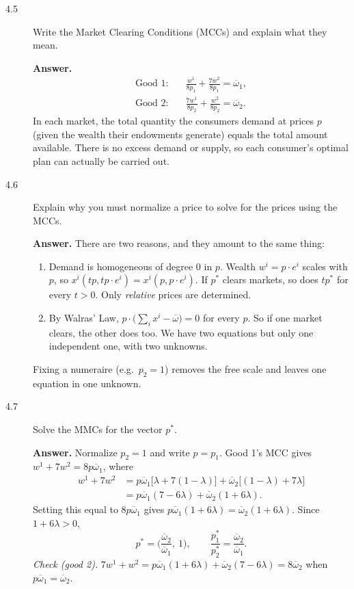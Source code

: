 \documentclass[11pt]{article}
\newcommand{\bw}{\overline{\omega}}
\newenvironment{solution}{\par\smallskip\noindent\textbf{Answer.} }{\par\medskip}
\begin{document}
\begin{description}
\item[4.5] Write the Market Clearing Conditions (MCCs) and explain what they mean.
\begin{solution}
\begin{align*}
\text{Good 1:}&\quad \frac{w^1}{8p_1}+\frac{7w^2}{8p_1}=\bw_1,\\
\text{Good 2:}&\quad \frac{7w^1}{8p_2}+\frac{w^2}{8p_2}=\bw_2.
\end{align*}
In each market, the total quantity the consumers demand at prices $p$ (given the wealth their endowments generate) equals the total amount available. There is no excess demand or supply, so each consumer's optimal plan can actually be carried out.
\end{solution}

\item[4.6] Explain why you must normalize a price to solve for the prices using the MCCs.
\begin{solution}
There are two reasons, and they amount to the same thing:
\begin{enumerate}[itemsep=0pt]
\item Demand is homogeneous of degree 0 in $p$. Wealth $w^i=p\cdot e^i$ scales with $p$, so $x^i(tp,tp\cdot e^i)=x^i(p,p\cdot e^i)$. If $p^*$ clears markets, so does $tp^*$ for every $t>0$. Only \emph{relative} prices are determined.
\item By Walras' Law, $p\cdot\big(\sum_i x^i-\bw\big)=0$ for every $p$. So if one market clears, the other does too. We have two equations but only one independent one, with two unknowns.
\end{enumerate}
Fixing a numeraire (e.g.\ $p_2=1$) removes the free scale and leaves one equation in one unknown.
\end{solution}

\item[4.7] Solve the MMCs for the vector $p^*$.
\begin{solution}
Normalize $p_2=1$ and write $p=p_1$. Good 1's MCC gives $w^1+7w^2=8p\bw_1$, where
\begin{align*}
w^1+7w^2&=p\bw_1\big[\lambda+7(1-\lambda)\big]+\bw_2\big[(1-\lambda)+7\lambda\big]\\
&=p\bw_1(7-6\lambda)+\bw_2(1+6\lambda).
\end{align*}
Setting this equal to $8p\bw_1$ gives $p\bw_1(1+6\lambda)=\bw_2(1+6\lambda)$. Since $1+6\lambda>0$,
\[
\boxed{\;p^*=\Big(\frac{\bw_2}{\bw_1},\ 1\Big),\qquad \frac{p_1^*}{p_2^*}=\frac{\bw_2}{\bw_1}.\;}
\]
\emph{Check (good 2).} $7w^1+w^2=p\bw_1(1+6\lambda)+\bw_2(7-6\lambda)=8\bw_2$ when $p\bw_1=\bw_2$. \checkmark


\end{solution}
\end{description}
\end{document}
